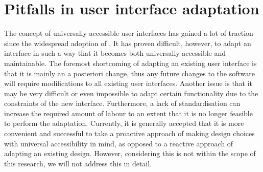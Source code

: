 \section{Pitfalls in user interface adaptation}
\label{section:pitfallsinuserinterfaceadaptation}
The concept of universally accessible user interfaces has gained a lot of traction since the widespread adoption of . It has proven difficult, however, to adapt an interface in such a way that it becomes both universally accessible and maintainable. The foremost shortcoming of adapting an existing user interface is that it is mainly an a posteriori change, thus any future changes to the software will require modifications to all existing user interfaces. Another issue is that it may be very difficult or even impossible to adapt certain functionality due to the constraints of the new interface\cite{emiliani2000adaptations}. Furthermore, a lack of standardisation can increase the required amount of labour to an extent that it is no longer feasible to perform the adaptation\cite{moore1993issues}. Currently, it is generally accepted that it is more convenient and successful to take a proactive approach of making design choices with universal accessibility in mind, as opposed to a reactive approach of adapting an existing design\cite{savidis2004unified}. However, considering this is not within the scope of this research, we will not address this in detail.